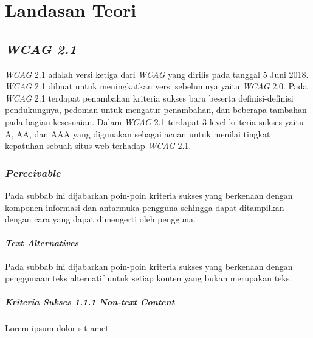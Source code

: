 \setcounter{secnumdepth}{4}
\titleformat{\paragraph}{\normalfont\normalsize\bfseries}{\theparagraph}{1em}{}

\chapter{Landasan Teori}
\label{chap:teori}

\section{\textit{WCAG 2.1}}
\label{sec:wcag_2.1} 
\textit{WCAG} 2.1 adalah versi ketiga dari \textit{WCAG} yang dirilis pada tanggal 5 Juni 2018. \textit{WCAG} 2.1 dibuat untuk meningkatkan versi sebelumnya yaitu \textit{WCAG} 2.0. Pada \textit{WCAG} 2.1 terdapat penambahan kriteria sukses baru beserta definisi-definisi pendukungnya, pedoman untuk mengatur penambahan, dan beberapa tambahan pada bagian kesesuaian. Dalam \textit{WCAG} 2.1 terdapat 3 level kriteria sukses yaitu A, AA, dan AAA yang digunakan sebagai acuan untuk menilai tingkat kepatuhan sebuah situs web terhadap \textit{WCAG} 2.1.

\subsection{\textit{Perceivable}}
\label{sec:perceivable}
Pada subbab ini dijabarkan poin-poin kriteria sukses yang berkenaan dengan komponen informasi dan antarmuka pengguna sehingga dapat ditampilkan dengan cara yang dapat dimengerti oleh pengguna.

\subsubsection{\textit{Text Alternatives}}
\label{sec:text_alternatives}
Pada subbab ini dijabarkan poin-poin kriteria sukses yang berkenaan dengan penggunaan teks alternatif untuk setiap konten yang bukan merupakan teks.

\paragraph{Kriteria Sukses 1.1.1 \textit{Non-text Content}}
\label{sec:kriteria_sukses_1.1.1}
Lorem ipsum dolor sit amet

